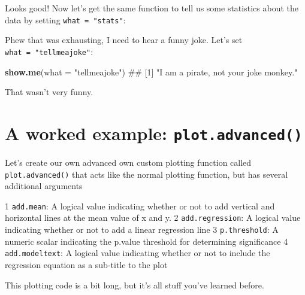 \documentclass[]{book}
\newenvironment{Shaded}{\begin{snugshade}}{\end{snugshade}}
\newcommand{\KeywordTok}[1]{\textcolor[rgb]{0.13,0.29,0.53}{\textbf{#1}}}
\newcommand{\DataTypeTok}[1]{\textcolor[rgb]{0.13,0.29,0.53}{#1}}
\newcommand{\StringTok}[1]{\textcolor[rgb]{0.31,0.60,0.02}{#1}}
\newcommand{\OperatorTok}[1]{\textcolor[rgb]{0.81,0.36,0.00}{\textbf{#1}}}
\newcommand{\NormalTok}[1]{#1}
\theoremstyle{definition}
\theoremstyle{definition}
\theoremstyle{remark}
\begin{document}
Looks good! Now let's get the same function to tell us some statistics
about the data by setting \texttt{what\ =\ "stats"}:

\begin{Shaded}
\end{Shaded}

Phew that was exhausting, I need to hear a funny joke. Let's set
\texttt{what\ =\ "tellmeajoke"}:

\begin{Shaded}
\begin{Highlighting}[]
\KeywordTok{show.me}\NormalTok{(}\DataTypeTok{what =} \StringTok{"tellmeajoke"}\NormalTok{)}
\NormalTok{## [1] "I am a pirate, not your joke monkey."}
\end{Highlighting}
\end{Shaded}

That wasn't very funny.

\section{\texorpdfstring{A worked example:
\texttt{plot.advanced()}}{A worked example: plot.advanced()}}\label{a-worked-example-plot.advanced}

Let's create our own advanced own custom plotting function called
\texttt{plot.advanced()} that acts like the normal plotting function,
but has several additional arguments

1 \texttt{add.mean}: A logical value indicating whether or not to add
vertical and horizontal lines at the mean value of x and y. 2
\texttt{add.regression}: A logical value indicating whether or not to
add a linear regression line 3 \texttt{p.threshold}: A numeric scalar
indicating the p.value threshold for determining significance 4
\texttt{add.modeltext}: A logical value indicating whether or not to
include the regression equation as a sub-title to the plot

This plotting code is a bit long, but it's all stuff you've learned
before.
\end{document}
